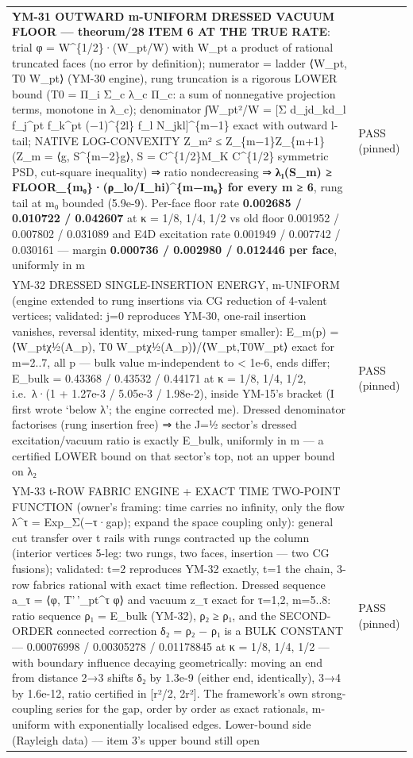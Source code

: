 \begin{longtable}[]{@{}
  >{\raggedright\arraybackslash}p{}
  >{\raggedright\arraybackslash}p{}@{}}
\textbf{YM-31 OUTWARD m-UNIFORM DRESSED VACUUM FLOOR --- theorum/28 ITEM 6 AT THE TRUE RATE}: trial φ = W\^{}\{1/2\}·(W\_pt/W) with W\_pt a product of rational truncated faces (no error by definition); numerator = ladder ⟨W\_pt, T0 W\_pt⟩ (YM-30 engine), rung truncation is a rigorous LOWER bound (T0 = Π\_i Σ\_c λ\_c Π\_c: a sum of nonnegative projection terms, monotone in λ\_c); denominator ∫W\_pt²/W = {[}Σ d\_jd\_kd\_l f\_j\^{}pt f\_k\^{}pt (−1)\^{}\{2l\} f\_l N\_jkl{]}\^{}\{m−1\} exact with outward l-tail; NATIVE LOG-CONVEXITY Z\_m² ≤ Z\_\{m−1\}Z\_\{m+1\} (Z\_m = ⟨g, S\^{}\{m−2\}g⟩, S = C\^{}\{1/2\}M\_K C\^{}\{1/2\} symmetric PSD, cut-square inequality) ⇒ ratio nondecreasing ⇒ \textbf{λ₁(S\_m) ≥ FLOOR\_\{m₀\}·(ρ\_lo/I\_hi)\^{}\{m−m₀\} for every m ≥ 6}, rung tail at m₀ bounded (5.9e-9). Per-face floor rate \textbf{0.002685 / 0.010722 / 0.042607} at κ = 1/8, 1/4, 1/2 vs old floor 0.001952 / 0.007802 / 0.031089 and E4D excitation rate 0.001949 / 0.007742 / 0.030161 --- margin \textbf{0.000736 / 0.002980 / 0.012446 per face}, uniformly in m & PASS (pinned) \\
YM-32 DRESSED SINGLE-INSERTION ENERGY, m-UNIFORM (engine extended to rung insertions via CG reduction of 4-valent vertices; validated: j=0 reproduces YM-30, one-rail insertion vanishes, reversal identity, mixed-rung tamper smaller): E\_m(p) = ⟨W\_ptχ½(A\_p), T0 W\_ptχ½(A\_p)⟩/⟨W\_pt,T0W\_pt⟩ exact for m=2..7, all p --- bulk value m-independent to \textless{} 1e-6, ends differ; E\_bulk = 0.43368 / 0.43532 / 0.44171 at κ = 1/8, 1/4, 1/2, i.e.~λ·(1 + 1.27e-3 / 5.05e-3 / 1.98e-2), inside YM-15's bracket (I first wrote `below λ'; the engine corrected me). Dressed denominator factorises (rung insertion free) ⇒ the J=½ sector's dressed excitation/vacuum ratio is exactly E\_bulk, uniformly in m --- a certified LOWER bound on that sector's top, not an upper bound on λ₂ & PASS (pinned) \\
YM-33 t-ROW FABRIC ENGINE + EXACT TIME TWO-POINT FUNCTION (owner's framing: time carries no infinity, only the flow λ\^{}τ = Exp\_Σ(−τ·gap); expand the space coupling only): general cut transfer over t rails with rungs contracted up the column (interior vertices 5-leg: two rungs, two faces, insertion --- two CG fusions); validated: t=2 reproduces YM-32 exactly, t=1 the chain, 3-row fabrics rational with exact time reflection. Dressed sequence a\_τ = ⟨φ, T'\,'\_pt\^{}τ φ⟩ and vacuum z\_τ exact for τ=1,2, m=5..8: ratio sequence ρ₁ = E\_bulk (YM-32), ρ₂ ≥ ρ₁, and the SECOND-ORDER connected correction δ₂ = ρ₂ − ρ₁ is a BULK CONSTANT --- 0.00076998 / 0.00305278 / 0.01178845 at κ = 1/8, 1/4, 1/2 --- with boundary influence decaying geometrically: moving an end from distance 2→3 shifts δ₂ by 1.3e-9 (either end, identically), 3→4 by 1.6e-12, ratio certified in {[}r²/2, 2r²{]}. The framework's own strong-coupling series for the gap, order by order as exact rationals, m-uniform with exponentially localised edges. Lower-bound side (Rayleigh data) --- item 3's upper bound still open & PASS (pinned) \\

\end{longtable}

